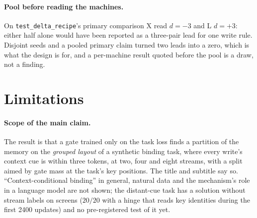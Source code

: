 \documentclass[11pt]{article}
\begin{document}
\paragraph{Pool before reading the machines.} On \texttt{test\_delta\_recipe}'s primary comparison X read $d = -3$ and L $d = +3$: either half alone would have been reported as a three-pair lead for one write rule. Disjoint seeds and a pooled primary claim turned two leads into a zero, which is what the design is for, and a per-machine result quoted before the pool is a draw, not a finding.

\section{Limitations}
\label{sec:limits}

\paragraph{Scope of the main claim.} The result is that a gate trained only on the task loss finds a partition of the memory on the \emph{grouped layout} of a synthetic binding task, where every write's context cue is within three tokens, at two, four and eight streams, with a split aimed by gate mass at the task's key positions. The title and subtitle say so. ``Context-conditional binding'' in general, natural data and the mechanism's role in a language model are not shown; the distant-cue task has a solution without stream labels on screens ($20/20$ with a hinge that reads key identities during the first 2400 updates) and no pre-registered test of it yet.
\end{document}
